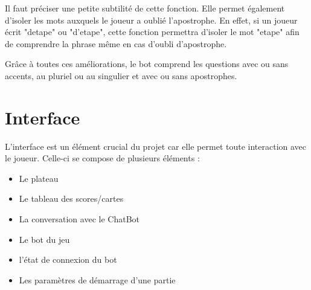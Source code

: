 \documentclass[a4paper, 11pt]{article}
\begin{document}
Il faut préciser une petite subtilité de cette fonction. Elle permet également d'isoler les mots auxquels le joueur a oublié l'apostrophe. En effet, si un joueur écrit "detape" ou "d'etape", cette fonction permettra d'isoler le mot "etape" afin de comprendre la phrase même en cas d'oubli d'apostrophe.\newline

Grâce à toutes ces améliorations, le bot comprend les questions avec ou sans accents, au pluriel ou au singulier et avec ou sans apostrophes.

\newpage

\section{Interface}

L'interface est un élément crucial du projet car elle permet toute interaction avec le joueur. Celle-ci se compose de plusieurs éléments :
\begin{itemize}
    \item Le plateau
    \item Le tableau des scores/cartes
    \item La conversation avec le ChatBot
    \item Le bot du jeu
    \item l'état de connexion du bot
    \item Les paramètres de démarrage d'une partie
\end{itemize}
\end{document}
